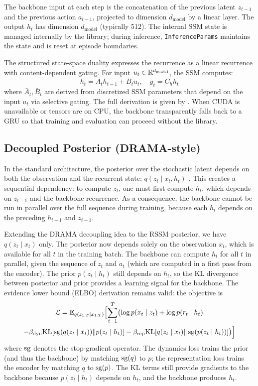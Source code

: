 The backbone input at each step is the concatenation of the previous latent $z_{t-1}$ and the previous action $a_{t-1}$, projected to dimension $d_{\text{model}}$ by a linear layer. The output $h_t$ has dimension $d_{\text{model}}$ (typically 512). The internal SSM state is managed internally by the \mamba{} library; during inference, \texttt{InferenceParams} maintains the state and is reset at episode boundaries.

The structured state-space duality expresses the recurrence as a linear recurrence with content-dependent gating. For input $u_t \in \mathbb{R}^{d_{\text{model}}}$, the SSM computes:
\begin{equation}
h_t = \bar{A}_t h_{t-1} + \bar{B}_t u_t, \quad y_t = C_h h_t
\end{equation}
where $\bar{A}_t, \bar{B}_t$ are derived from discretized SSM parameters that depend on the input $u_t$ via selective gating. The full derivation is given by \citet{dao2024mamba2}. When CUDA is unavailable or tensors are on CPU, the backbone transparently falls back to a GRU so that training and evaluation can proceed without the \mamba{} library.

\subsection{Decoupled Posterior (DRAMA-style)}

In the standard \dreamer{} architecture, the posterior over the stochastic latent depends on both the observation and the recurrent state: $q(z_t \mid x_t, h_t)$ \citep{hafner2023dreamerv3}. This creates a sequential dependency: to compute $z_t$, one must first compute $h_t$, which depends on $z_{t-1}$ and the backbone recurrence. As a consequence, the backbone cannot be run in parallel over the full sequence during training, because each $h_t$ depends on the preceding $h_{t-1}$ and $z_{t-1}$.

Extending the DRAMA decoupling idea \citep{rajbhandari2024drama} to the RSSM posterior, we have $q(z_t \mid x_t)$ only. The posterior now depends solely on the observation $x_t$, which is available for all $t$ in the training batch. The backbone can compute $h_t$ for all $t$ in parallel, given the sequence of $z_t$ and $a_t$ (which are computed in a first pass from the encoder). The prior $p(z_t \mid h_t)$ still depends on $h_t$, so the KL divergence between posterior and prior provides a learning signal for the backbone. The evidence lower bound (ELBO) derivation remains valid: the objective is
\begin{multline}
\mathcal{L} = \mathbb{E}_{q(z_{1:T} \mid x_{1:T})} \Bigl[ \sum_{t=1}^{T} \bigl( \log p(x_t \mid z_t) + \log p(r_t \mid h_t) \\
 - \beta_{\text{dyn}} \mathrm{KL}[\operatorname{sg}(q(z_t \mid x_t)) \| p(z_t \mid h_t)]
 - \beta_{\text{rep}} \mathrm{KL}[q(z_t \mid x_t) \| \operatorname{sg}(p(z_t \mid h_t))] \bigr) \Bigr]
\end{multline}
where $\operatorname{sg}$ denotes the stop-gradient operator. The dynamics loss trains the prior (and thus the backbone) by matching $\operatorname{sg}(q)$ to $p$; the representation loss trains the encoder by matching $q$ to $\operatorname{sg}(p)$. The KL terms still provide gradients to the backbone because $p(z_t \mid h_t)$ depends on $h_t$, and the backbone produces $h_t$.

